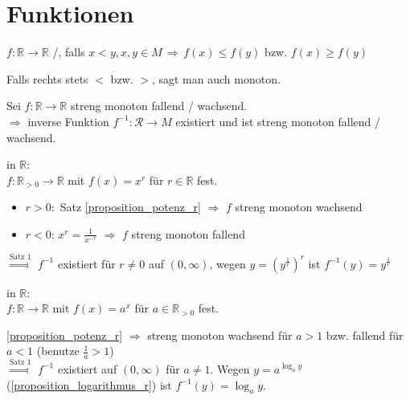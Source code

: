 \addtocounter{section}{12}
\section{Funktionen}
\begin{*definition}
	$f:\mathbb{R}\to \mathbb{R}$ /, falls $x < y, x,y\in M \,\Rightarrow \,f(x) \le f(y)$ bzw. $f(x) \ge f(y)$
	
	Falls rechts stets $<$ bzw. $>$, sagt man auch  monoton.
\end{*definition}

\begin{proposition}
	Sei $f:\mathbb{R}\rightarrow \mathbb{R}$ streng monoton fallend / wachsend.\\
	$\Rightarrow$ inverse Funktion $f^{-1}:\mathcal{R}\rightarrow M$ existiert und ist streng monoton fallend / wachsend.
\end{proposition}
\begin{example}
	 in $\mathbb{R}$:\\
	$f:\mathbb{R}_{>0} \to \mathbb{R}$ mit $f(x) = x^r$ für $r\in\mathbb{R}$ fest.
	
	\begin{itemize}
		\item $r > 0:$ Satz \ref{proposition_potenz_r} $\Rightarrow$ $f$ streng monoton wachsend
		\item $r < 0$: $x^r = \frac{1}{x^{-r}}$ $\Rightarrow$ $f$ streng monoton fallend
	\end{itemize}
	$\overset{\text{Satz 1}}{\Rightarrow}$ $f^{-1}$ existiert für $r\neq 0$ auf $(0,\infty)$, wegen $ y = (y^{\frac{1}{r}})^r$ ist $f^{-1}(y) = y^{\frac{1}{r}}$
\end{example}
\begin{example}
	 in $\mathbb{R}$:\\
	$f:\mathbb{R}\rightarrow\mathbb{R}$ mit $f(x) = a^x$ für $a\in\mathbb{R}_{>0}$ fest.
	
	\ref{proposition_potenz_r} $\Rightarrow$ streng monoton wachsend für $a > 1$ bzw. fallend für $a < 1$ (benutze $\frac{1}{a} > 1$)\\
	$\overset{\text{Satz 1}}{\Rightarrow}$ $f^{-1}$ existiert auf $(0,\infty)$ für $a \neq 1$. Wegen $y = a^{\log_a y}$ (\ref{proposition_logarithmus_r}) ist $f^{-1} (y) = \log_a y$.
\end{example}
